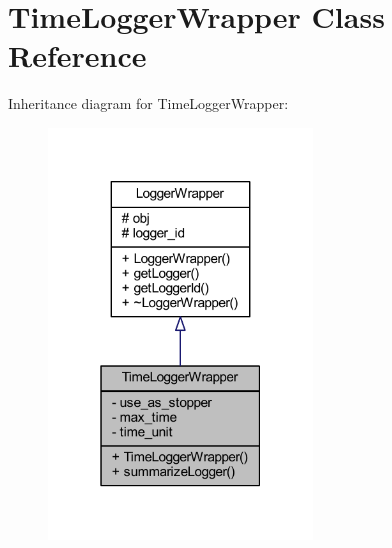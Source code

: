 \hypertarget{class_time_logger_wrapper}{}\section{Time\+Logger\+Wrapper Class Reference}
\label{class_time_logger_wrapper}


Inheritance diagram for Time\+Logger\+Wrapper\+:\nopagebreak
\begin{figure}[H]
\begin{center}
\leavevmode
\includegraphics[width=199pt]{class_time_logger_wrapper__inherit__graph}
\end{center}
\end{figure}


